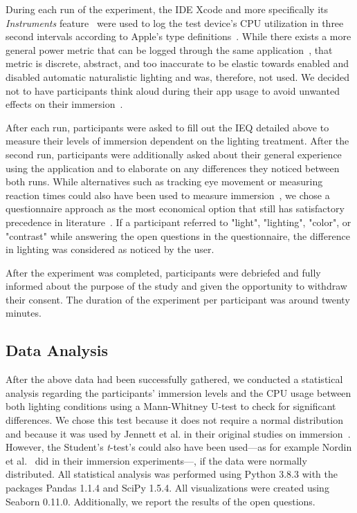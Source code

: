 \documentclass[12pt,twoside,english]{article}
\begin{document}
During each run of the experiment, the \gls{IDE} Xcode and more specifically its \textit{Instruments} feature~\cite{apple_xcode_2020} were used to log the test device's \gls{CPU} utilization in three second intervals according to Apple's type definitions~\cite{apple_system_2020}.
While there exists a more general power metric that can be logged through the same application~\cite{apple_energy_2020-1}, that metric is discrete, abstract, and too inaccurate to be elastic towards enabled and disabled automatic naturalistic lighting and was, therefore, not used.
We decided not to have participants think aloud during their app usage to avoid unwanted effects on their immersion~\cite{van_den_haak_retrospective_2003}.

After each run, participants were asked to fill out the \gls{IEQ} detailed above to measure their levels of immersion dependent on the lighting treatment.
After the second run, participants were additionally asked about their general experience using the application and to elaborate on any differences they noticed between both runs.
While alternatives such as tracking eye movement or measuring reaction times could also have been used to measure immersion~\cite{jennett_measuring_2008}, we chose a questionnaire approach as the most economical option that still has satisfactory precedence in literature~\cite{boyle_engagement_2012}.
If a participant referred to "light", "lighting", "color", or "contrast" while answering the open questions in the questionnaire, the difference in lighting was considered as noticed by the user.

After the experiment was completed, participants were debriefed and fully informed about the purpose of the study and given the opportunity to withdraw their consent.
The duration of the experiment per participant was around twenty minutes.

\subsection{Data Analysis}
\label{sect:data_analysis}

After the above data had been successfully gathered, we conducted a statistical analysis regarding the participants' immersion levels and the \gls{CPU} usage between both lighting conditions using a Mann-Whitney U-test to check for significant differences.
We chose this test because it does not require a normal distribution and because it was used by Jennett et al. in their original studies on immersion~\cite{jennett_measuring_2008}.
However, the Student's \textit{t}-test's could also have been used---as for example Nordin et al.~\cite{nordin_attention_2013} did in their immersion experiments---, if the data were normally distributed.
All statistical analysis was performed using Python 3.8.3 with the packages Pandas 1.1.4 and SciPy 1.5.4.
All visualizations were created using Seaborn 0.11.0.
Additionally, we report the results of the open questions.
\end{document}
